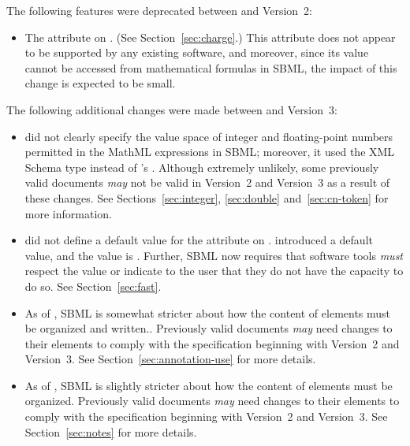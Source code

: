 The following features were deprecated between \sbmltwoone and
Version~2:
\begin{itemize}
  
\item The  attribute on \Species.  (See
  Section~\ref{sec:charge}.)  This attribute does not appear to be
  supported by any existing software, and moreover, since its
  value cannot be accessed from mathematical formulas in SBML, the
  impact of this change is expected to be small.

\end{itemize}

The following additional changes were made between \sbmltwoone and
Version~3:
\begin{itemize}

\item \sbmltwoone did not clearly specify the value space of
  integer and floating-point numbers permitted in the MathML
  expressions in SBML; moreover, it used the XML Schema type
   instead of \sbmltwotwo's .  Although
  extremely unlikely, some previously valid \sbmltwoone documents
  \emph{may} not be valid in Version~2 and Version~3 as a result
  of these changes.  See Sections~\ref{sec:integer},
  \ref{sec:double} and~\ref{sec:cn-token} for more information.

\item \sbmltwoone did not define a default value for the attribute
   on \Reaction.  \sbmltwotwo introduced a default
  value, and the value is .  Further, SBML now requires
  that software tools \emph{must} respect the value or indicate to
  the user that they do not have the capacity to do so.  See
  Section~\ref{sec:fast}.
  
\item As of \sbmltwotwo, SBML is somewhat stricter about how the
  content of  elements must be organized and
  written..  Previously valid \sbmltwoone documents \emph{may}
  need changes to their  elements to comply with
  the specification beginning with Version~2 and Version~3.  See
  Section~\ref{sec:annotation-use} for more details.
  
\item As of \sbmltwotwo, SBML is slightly stricter about how the
  content of  elements must be organized.  Previously
  valid \sbmltwoone documents \emph{may} need changes to their
   elements to comply with the specification
  beginning with Version~2 and Version~3.  See
  Section~\ref{sec:notes} for more details.
  

\end{itemize}
